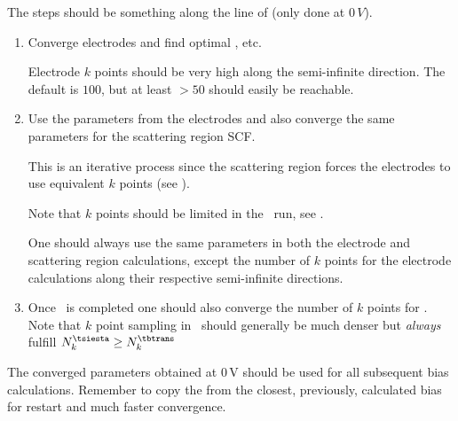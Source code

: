 The steps should be something along the line of (only done at
$0\, V$).
\begin{enumerate}

  \item%
  Converge electrodes and find optimal ,
   etc.

  Electrode $k$ points should be very high along the semi-infinite
  direction. The default is $100$, but at least $>50$ should easily be
  reachable.


  \item%
  Use the parameters from the electrodes and also converge the
  same parameters for the scattering region SCF.

  This is an iterative process since the scattering region forces the
  electrodes to use equivalent $k$ points (see
  ).

  Note that $k$ points should be limited in the \tsiesta\ run, see
  .

  One should always use the same parameters in both the electrode and
  scattering region calculations, except the number of $k$ points for
  the electrode calculations along their respective semi-infinite
  directions.


  \item%
  Once \tsiesta\ is completed one should also converge the
  number of $k$ points for \tbtrans. Note that $k$ point sampling in
  \tbtrans\ should generally be much denser but \emph{always} fulfill
  $N_k^{\tsiesta}\geq N_k^\tbtrans$
  
\end{enumerate}

The converged parameters obtained at $0\,\mathrm V$ should be used for
all subsequent bias calculations. Remember to copy the 
from the closest, previously, calculated bias for restart and much
faster convergence.


